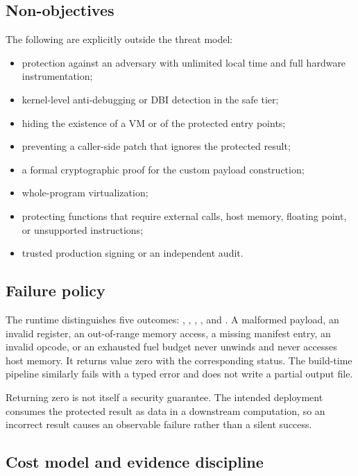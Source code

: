 \subsection{Non-objectives}

The following are explicitly outside the threat model:

\begin{itemize}
  \item protection against an adversary with unlimited local time and full
        hardware instrumentation;
  \item kernel-level anti-debugging or DBI detection in the safe tier;
  \item hiding the existence of a VM or of the protected entry points;
  \item preventing a caller-side patch that ignores the protected result;
  \item a formal cryptographic proof for the custom payload construction;
  \item whole-program virtualization;
  \item protecting functions that require external calls, host memory, floating
        point, or unsupported instructions;
  \item trusted production signing or an independent audit.
\end{itemize}

\subsection{Failure policy}

The runtime distinguishes five outcomes: , ,
, , and . A malformed payload,
an invalid register, an out-of-range memory access, a missing manifest entry, an
invalid opcode, or an exhausted fuel budget never unwinds and never accesses host
memory. It returns value zero with the corresponding status. The build-time
pipeline similarly fails with a typed error and does not write a partial output
file.

Returning zero is not itself a security guarantee. The intended deployment
consumes the protected result as data in a downstream computation, so an
incorrect result causes an observable failure rather than a silent success.

\subsection{Cost model and evidence discipline}

